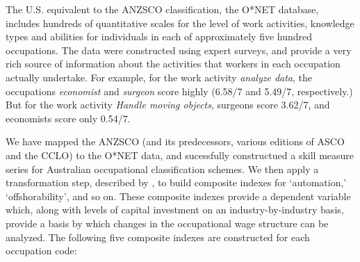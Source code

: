 The U.S. equivalent to the ANZSCO classification, the O*NET database, includes hundreds of quantitative scales for the level of work activities, knowledge types and abilities for individuals in each of approximately five hundred occupations. The data were constructed using expert surveys, and provide a very rich source of information about the activities that workers in each occupation actually undertake. For example, for the work activity {\em analyze data}, the occupations {\em economist} and {\em surgeon} score highly (6.58/7 and 5.49/7, respectively.) But for the work activity {\em Handle moving objects}, surgeons score 3.62/7, and economists score only 0.54/7.

We have mapped the ANZSCO (and its predecessors, various editions of ASCO and the CCLO) to the O*NET data, and sucessfully constructued a skill measure series for Australian occupational classification schemes. We then apply a transformation step, described by \citet{Firpo2011}, to build composite indexes for `automation,' `offshorability', and so on. These composite indexes provide a dependent variable which, along with levels of capital investment on an industry-by-industry basis, provide a basis by which changes in the occupational wage structure can be analyzed. The following five composite indexes are constructed for each occupation code:

